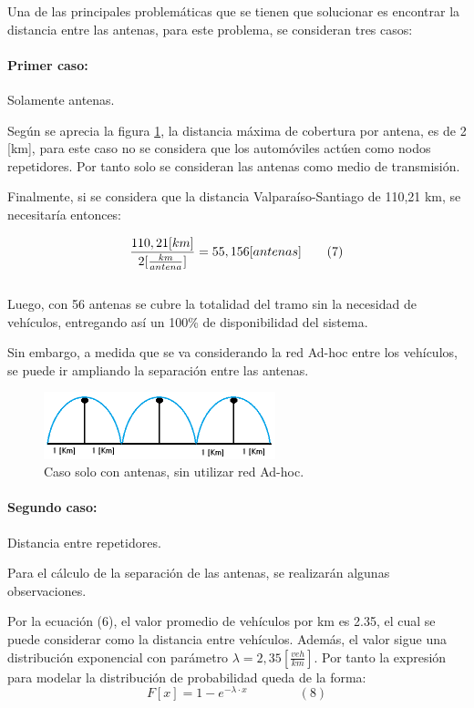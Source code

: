 \documentclass[12pt]{article}
\begin{document}
Una de las principales problemáticas que se tienen que solucionar es encontrar la distancia entre las antenas,
para este problema, se consideran tres casos:
\paragraph{Primer caso:} Solamente antenas.

Según se aprecia la figura \ref{fig:s-adhoc}, la distancia máxima de cobertura por antena, es de 2 [km], 
para este caso no se considera que los automóviles actúen como nodos repetidores. Por tanto solo se 
consideran las antenas como medio de transmisión.

Finalmente, si se considera que la distancia Valparaíso-Santiago de 110,21 km, se necesitaría entonces:

\large $$ \frac{110,21 [km]}{2 [\frac{km}{antena}]}= 55,156 [antenas] \qquad \tiny(7)$$ \normalsize \\

Luego, con 56 antenas se cubre la totalidad del tramo sin la necesidad de vehículos, entregando así un 
100\% de disponibilidad del sistema.

Sin embargo, a medida que se va considerando la red Ad-hoc entre los vehículos, se puede ir  ampliando 
la separación entre las antenas.  

\begin{figure}[H]
  \centering
      \includegraphics[width=0.6\textwidth]{s-adhoc}
	    \caption{Caso solo con antenas, sin utilizar red Ad-hoc.}
	\label{fig:s-adhoc}
\end{figure}
\paragraph{Segundo caso:} Distancia entre repetidores.

Para el cálculo de la separación de las antenas, se realizarán algunas observaciones.

Por la ecuación (6), el valor promedio de vehículos por km es 2.35, el cual se puede considerar como 
la distancia entre vehículos. Además, el valor sigue una distribución exponencial con parámetro 
$\lambda=2,35 [\frac{veh}{km}]$. Por tanto la expresión para modelar la distribución de probabilidad queda 
de la forma:
$$ F[x]= 1-e^{-\lambda \cdot x} \qquad \qquad  (8)$$
\end{document}
